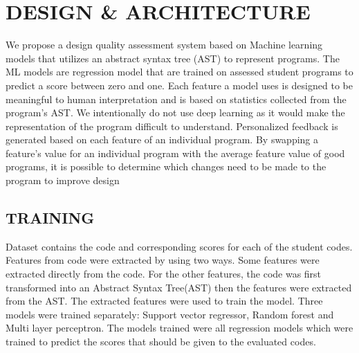 
\chapter{DESIGN \& ARCHITECTURE}


We propose a design quality assessment system based on Machine learning models that utilizes an abstract syntax tree (AST) to represent programs. The ML models are regression model that are trained on assessed student programs to predict a score between zero and one. Each feature a model uses is designed to be meaningful to human interpretation and is based on statistics collected from the program’s AST. We intentionally do not use deep learning as it would make the representation of the program difficult to understand. Personalized feedback is generated based on each feature of an individual program. By swapping a feature’s value for an individual program with the average feature value of good programs, it is possible to determine which changes need to be made to the program to improve design


\section{TRAINING} 

Dataset contains the code and corresponding scores for each of the student codes. Features from code were extracted by using two ways. Some features were extracted directly from the code. For the other features, the code was first transformed into an Abstract Syntax Tree(AST) then the features were extracted from the AST. The extracted features were used to train the model. Three models were trained separately: Support vector regressor, Random forest and Multi layer perceptron. The models trained were all regression models which were trained to predict the scores that should be given to the evaluated codes. 

